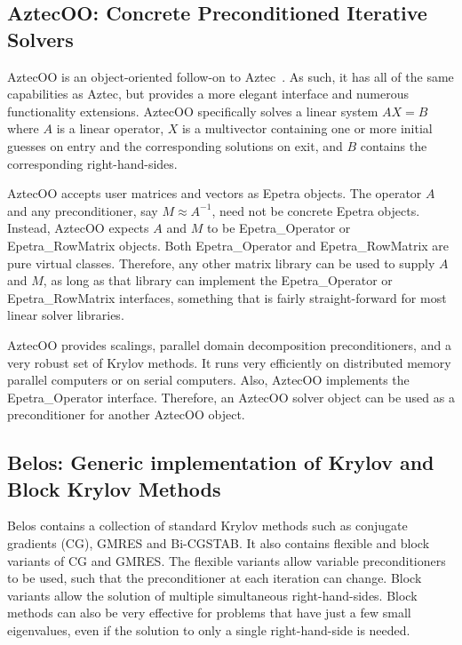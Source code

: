 \documentclass[12pt,relax]{TPA}
\begin{document}
\subsection{AztecOO: Concrete Preconditioned Iterative Solvers}

AztecOO is an object-oriented follow-on to Aztec~\cite{Aztec2.1}.  
As such, it has all of the same capabilities as Aztec, but provides 
a more elegant interface and numerous functionality extensions.  
AztecOO specifically solves a linear system $AX=B$ where $A$ is a 
linear operator, $X$ is a multivector containing one or more initial 
guesses on entry and the corresponding solutions on exit, and $B$ 
contains the corresponding right-hand-sides.

AztecOO accepts user matrices and vectors as Epetra objects.  The 
operator $A$ and any preconditioner, say $M \approx A^{-1}$, need 
not be concrete Epetra objects.  Instead, AztecOO expects $A$ and 
$M$ to be Epetra\_Operator or Epetra\_RowMatrix objects.  Both 
Epetra\_Operator and Epetra\_RowMatrix are pure virtual classes.  
Therefore, any other matrix library can be used to supply $A$ 
and $M$, as long as that library can implement the  Epetra\_Operator 
or Epetra\_RowMatrix interfaces, something that is fairly 
straight-forward for most linear solver libraries.

AztecOO provides scalings, parallel domain decomposition 
preconditioners, and a very robust set of Krylov methods.  It runs 
very efficiently on distributed memory parallel computers or on 
serial computers.  Also, AztecOO implements the Epetra\_Operator 
interface.  Therefore, an AztecOO solver object can be used as a 
preconditioner for another AztecOO object.

\subsection{Belos: Generic implementation of Krylov and Block Krylov
Methods}

Belos contains a collection of standard Krylov methods such as
conjugate gradients (CG), GMRES and Bi-CGSTAB.  It also contains flexible
and block variants of CG and GMRES.  The
flexible variants allow variable preconditioners to be used, such that
the preconditioner at each iteration can change.  Block variants allow
the solution of multiple simultaneous right-hand-sides.  Block methods
can also be very effective for problems that have just a few small
eigenvalues, even if the solution to only a single right-hand-side is
needed.
\end{document}
